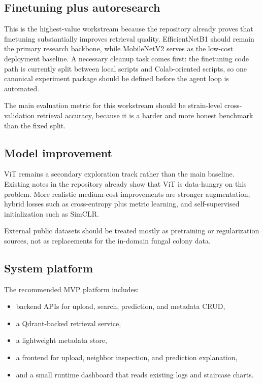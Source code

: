 \documentclass[11pt]{article}
\begin{document}
\subsection{Finetuning plus autoresearch}

This is the highest-value workstream because the repository already proves that finetuning
substantially improves retrieval quality. EfficientNetB1 should remain the primary research
backbone, while MobileNetV2 serves as the low-cost deployment baseline. A necessary cleanup
task comes first: the finetuning code path is currently split between local scripts and
Colab-oriented scripts, so one canonical experiment package should be defined before the
agent loop is automated.

The main evaluation metric for this workstream should be strain-level cross-validation
retrieval accuracy, because it is a harder and more honest benchmark than the fixed split.

\subsection{Model improvement}

ViT remains a secondary exploration track rather than the main baseline. Existing notes in
the repository already show that ViT is data-hungry on this problem. More realistic medium-cost
improvements are stronger augmentation, hybrid losses such as cross-entropy plus metric learning,
and self-supervised initialization such as SimCLR.

External public datasets should be treated mostly as pretraining or regularization sources,
not as replacements for the in-domain fungal colony data.

\subsection{System platform}

The recommended MVP platform includes:

\begin{itemize}
  \item backend APIs for upload, search, prediction, and metadata CRUD,
  \item a Qdrant-backed retrieval service,
  \item a lightweight metadata store,
  \item a frontend for upload, neighbor inspection, and prediction explanation,
  \item and a small runtime dashboard that reads existing logs and staircase charts.
\end{itemize}
\end{document}
